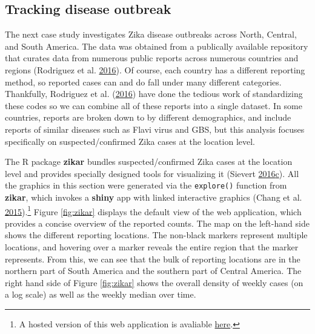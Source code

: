 \documentclass[12pt,]{isuthesis}
\let\rmarkdownfootnote\footnote%
\def\footnote{\protect\rmarkdownfootnote}
\begin{document}
\subsection{Tracking disease outbreak}\label{tracking-disease-outbreak}

The next case study investigates Zika disease outbreaks across North,
Central, and South America. The data was obtained from a publically
available repository that curates data from numerous public reports
across numerous countries and regions (Rodriguez et al.
\protect\hyperlink{ref-zika-data}{2016}). Of course, each country has a
different reporting method, so reported cases can and do fall under many
different categories. Thankfully, Rodriguez et al.
(\protect\hyperlink{ref-zika-data}{2016}) have done the tedious work of
standardizing these codes so we can combine all of these reports into a
single dataset. In some countries, reports are broken down to by
different demographics, and include reports of similar diseases such as
Flavi virus and GBS, but this analysis focuses specifically on
suspected/confirmed Zika cases at the location level.

The R package \textbf{zikar} bundles suspected/confirmed Zika cases at
the location level and provides specially designed tools for visualizing
it (Sievert
\protect\hyperlink{ref-zikar}{2016}\protect\hyperlink{ref-zikar}{c}).
All the graphics in this section were generated via the
\texttt{explore()} function from \textbf{zikar}, which invokes a
\textbf{shiny} app with linked interactive graphics (Chang et al.
\protect\hyperlink{ref-shiny}{2015}).\footnote{A hosted version of this
  web application is avaliable
  \href{http://104.131.111.111:3838/zikar/}{here}.} Figure
\ref{fig:zikar} displays the default view of the web application, which
provides a concise overview of the reported counts. The map on the
left-hand side shows the different reporting locations. The non-black
markers represent multiple locations, and hovering over a marker reveals
the entire region that the marker represents. From this, we can see that
the bulk of reporting locations are in the northern part of South
America and the southern part of Central America. The right hand side of
Figure \ref{fig:zikar} shows the overall density of weekly cases (on a
log scale) as well as the weekly median over time.
\end{document}
